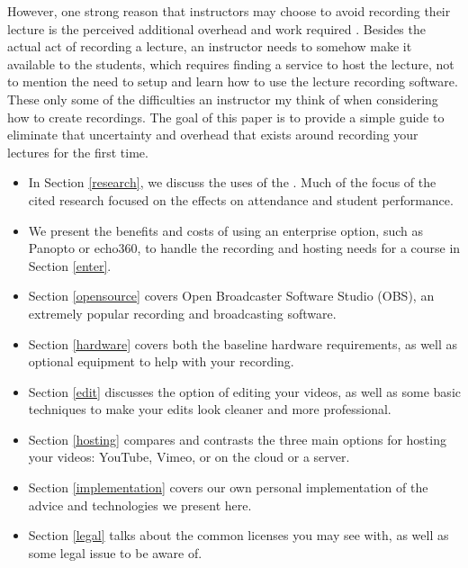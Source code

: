 \documentclass[sigconf]{acmart}
\begin{document}
However, one strong reason that instructors may choose to avoid recording their lecture is the perceived additional overhead and work required \cite{maynor2013student}.
Besides the actual act of recording a lecture, an instructor needs to somehow make it available to the students, which requires finding a service to host the lecture, not to mention the need to setup and learn how to use the lecture recording software.
These only some of the difficulties an instructor my think of when considering how to create recordings.
The goal of this paper is to provide a simple guide to eliminate that uncertainty and overhead that exists around recording your lectures for the first time.





\begin{itemize}
	\item In Section \ref{research}, we discuss the uses of the .  Much of the focus of the cited research focused on the effects on attendance and student performance.
	\item We present the benefits and costs of using an enterprise option, such as Panopto or echo360, to handle the recording and hosting needs for a course in Section \ref{enter}.
	\item Section \ref{opensource} covers Open Broadcaster Software Studio (OBS), an extremely popular recording and broadcasting software.
	\item Section \ref{hardware} covers both the baseline hardware requirements, as well as optional equipment to help with your recording.
	\item Section \ref{edit} discusses the option of editing your videos, as well as some basic techniques to make your edits look cleaner and more professional.
	\item Section \ref{hosting} compares and contrasts the three main options for hosting your videos: YouTube, Vimeo, or on the cloud or a server.
	\item Section \ref{implementation} covers our own personal implementation of the advice and technologies we present here.
	\item Section \ref{legal} talks about the common licenses you may see with, as well as some legal issue to be aware of.
\end{itemize}
\end{document}
